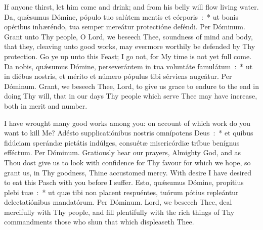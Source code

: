 {{
  \newcommand{\commvlatin}{Eripe me, Dómine, ab hómine \textbf{ma}lo.}
  \newcommand{\commrlatin}{A viro iníquo éri\textbf{pe} me.}
  \newcommand{\commvtranslation}{Deliver me, O Lord, from the wicked man.}
  \newcommand{\commrtranslation}{And save me from the evil-doer.}
  \newcommand{\vrtitle}{Eripe me}
  \newcommand{\vrlabel}{commvreripeme}
  {
    {If anyone thirst, let him come and drink; and from his belly will flow living water.}
    {Da, quǽsumus Dómine, pópulo tuo salútem mentis et córporis~:~* ut bonis opéribus inhæréndo, tua semper mereátur protectióne deféndi. Per Dóminum.}
    {Grant unto Thy people, O Lord, we beseech Thee, soundness of mind and body, that they, cleaving unto good works, may evermore worthily be defended by Thy protection.}
  }
  {%
  {Go ye up unto this Feast; I go not, for My time is not yet full come.}
  {Da nobis, quǽsumus Dómine, perseverántem in tua voluntáte famulátum~:~* ut in diébus nostris, et mérito et número pópulus tibi sérviens augeátur. Per Dóminum.}
  {Grant, we beseech Thee, Lord, to give us grace to endure to the end in doing Thy will, that in our days Thy people which serve Thee may have increase, both in merit and number.}
  }

  {
  \def\precollect{\vspace{-0.5\baselineskip}}
    {I have wrought many good works among you: on account of which work do you want to kill Me?}
    {Adésto supplicatiónibus nostris omnípotens Deus~:~* et quibus fidúciam sperándæ pietátis indúlges, consuétæ misericórdiæ tríbue benígnus efféctum. Per Dóminum.}
    {Gratiously hear our prayers, Almighty God, and as Thou dost give us to look with confidence for Thy favour for which we hope, so grant us, in Thy goodness, Thine accustomed mercy.}
  }
  {With desire I have desired to eat this Pasch with you before I suffer.}
  {Esto, quǽsumus Dómine, propítius plebi tuæ~:~* ut quæ tibi non placent respuéntes, tuórum pótius repleántur delectatiónibus mandatórum. Per Dóminum.}
  {Lord, we beseech Thee, deal mercifully with Thy people, and fill plentifully with the rich things of Thy commandments those who shun that which displeaseth Thee.}

}}
